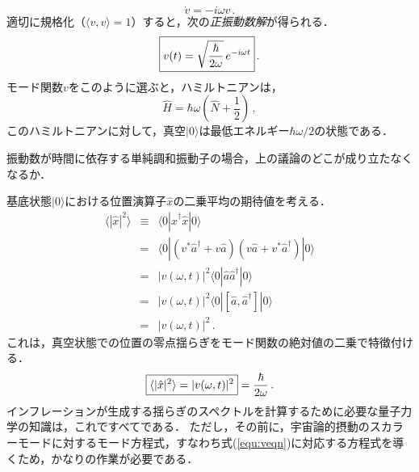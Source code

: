 \begin{equation}
\dot{v} = - i \omega v\, .
\end{equation}
適切に規格化（$\langle v, v \rangle = 1$）すると，次の{\it 正振動数解}が得られる．
\begin{equation}
\label{equ:mode2}
\fbox{$\displaystyle v(t) = \sqrt{\frac{\hbar}{2 \omega}} \, e^{-i \omega t}$}\, .
\end{equation}
モード関数$v$をこのように選ぶと，ハミルトニアンは，
\begin{equation}
\hat{H} = \hbar \omega \left(\hat{N}+\frac{1}{2} \right)\, ,
\end{equation}
このハミルトニアンに対して，真空$|0\rangle$は最低エネルギー$\hbar \omega /2$の状態である．

\begin{thm}[時間依存振動子の非一意性]
振動数が時間に依存する単純調和振動子の場合，上の議論のどこが成り立たなくなるか．
\label{ex:separate}
\end{thm}


基底状態$|0\rangle$における位置演算子$\hat{x}$の二乗平均の期待値を考える．
\begin{eqnarray}
\langle |\hat{x}|^2 \rangle &\equiv& \langle 0|\hat{x}^\dagger \hat{x}|0\rangle \nonumber\\
&=& \langle 0|(v^* \hat{a}^\dagger + v \hat{a})(v \hat{a}+v^* \hat{a}^\dagger )|0\rangle \nonumber\\
&=& |v(\omega,t)|^2 \langle 0|\hat{a} \hat{a}^\dagger |0\rangle \nonumber\\
&=& |v(\omega,t)|^2 \langle 0|[\hat{a}, \hat{a}^\dagger] |0\rangle \nonumber\\
&=& |v(\omega,t)|^2\, .
\end{eqnarray}
これは，真空状態での位置の零点揺らぎをモード関数の絶対値の二乗で特徴付ける．
\begin{equation}
\label{equ:fluc}
\fbox{$\displaystyle \langle |\hat{x}|^2 \rangle = |v(\omega,t)|^2$} = \frac{\hbar}{2\omega}\, .
\end{equation}
インフレーションが生成する揺らぎのスペクトルを計算するために必要な量子力学の知識は，これですべてである．
ただし，その前に，宇宙論的摂動のスカラーモードに対するモード方程式，すなわち式(\ref{equ:veqn})に対応する方程式を導くため，かなりの作業が必要である．



